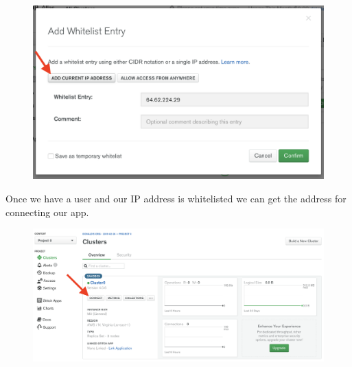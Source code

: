 \documentclass{42-en}
\begin{document}
\begin{figure}[H]
    \begin{center}
        \includegraphics[width=14cm]{WEB/mongo_9.png}
    \end{center}
\end{figure}

\newpage
Once we have a user and our IP address is whitelisted we can get the address for connecting our app.
\begin{figure}[H]
    \begin{center}
        \includegraphics[width=14cm]{WEB/mongo_10.png}
    \end{center}
\end{figure}
\end{document}
